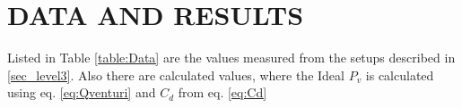 \documentclass[%
 aapm,
 mph,%
 amsmath,amssymb,
 reprint,%
]{revtex4-2}
\begin{document}

\newpage
\section{DATA AND RESULTS}

Listed in Table \ref{table:Data} are the values measured from the setups described in \ref{sec_level3}. Also there are calculated values, where the Ideal $P_v$ is calculated using eq. \ref{eq:Qventuri} and $C_d$ from eq. \ref{eq:Cd}
\end{document}
